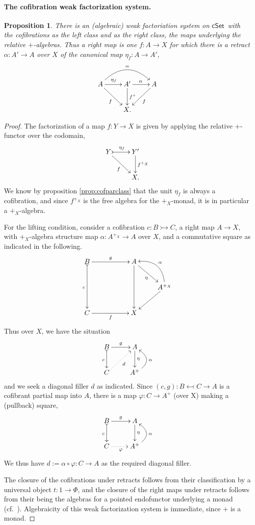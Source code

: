 \documentclass[12pt]{article}
\newcommand{\cSet}{\ensuremath{\mathsf{cSet}}}
\newcommand{\mono}{\ensuremath{\rightarrowtail}}
\newcommand{\ra}{\ensuremath{\rightarrow}}
\newtheorem{proposition}[theorem]{Proposition}
\theoremstyle{remark}
\theoremstyle{definition}
\begin{document}
\paragraph{The cofibration weak factorization system.}

\begin{proposition}
There is an (algebraic) weak factoriation system on \cSet\ with the cofibrations as the left class and as the right class, the maps underlying the relative $+$-algebras. Thus a right map is one $f :A\ra X$ for which there is a retract $\alpha : A'\ra A$ over $X$ of the canonical map $\eta_f : A\ra A'$,
\[
\xymatrix{
A\ar[rd]_{f} \ar[r]^{\eta_f} \ar@/^5ex/ [rr]^= & A' \ar[r]^{\alpha} \ar[d]^-{f^+} & \ar[ld]^{f} A \\
& X. &
}
\]
\end{proposition}
\begin{proof}
The factorization of a map $f : Y\ra X$ is given by applying the relative $+$-functor over the codomain,
\[
\xymatrix{
Y\ar[rd]_{f} \ar@{>->}[r]^{\eta_f} & Y' \ar[d]^-{f^{+_X}} \\
& X. 
}
\]
We know by proposition \ref{prop:cofparclass} that the unit $\eta_f$ is always a cofibration, and since $f^{+_{X}}$ is the free algebra for the $+_X$-monad, it is in particular a $+_X$-algebra.

For the lifting condition, consider a cofibration $c : B\mono C$, a right map $A\ra X$, with $+_X$-algebra structure map $\alpha: A^{+_{X}} \ra A$ over $X$, and a commutative square as indicated in the following.
\[
\xymatrix{
B \ar@{>->}[dd]_{c} \ar[rr]^{g}  && A \ar[dd] \ar[rd]_{\eta} & \\
 &&& A^{+_{X}} \ar@/_4ex/ [lu]_\alpha  \ar[ld] \\
C \ar[rr]_{f} && X &
}
\]
Thus over $X$, we have the situation
\[
\xymatrix{
B\ar@{>->}[d]_{c} \ar[r]^{g} & A \ar[d]^-{\eta} \\
C \ar@{.>}[ru]_{d} & A^+ \ar@/_4ex/ [u]_\alpha
}
\]
and we seek a diagonal filler $d$ as indicated.
Since $(c,g) : B \leftarrowtail C \ra A$ is a cofibrant partial map into $A$, there is a map $\varphi : C \ra A^+$ (over X) making a (pullback) square,
\[
\xymatrix{
B\ar@{>->}[d]_{c} \ar[r]^{g} & A \ar[d]^-{\eta} \\
C \ar@{.>}[r]_{\varphi} & A^+ \ar@/_4ex/ [u]_\alpha
}
\]
We thus have $d := \alpha\circ \varphi : C \ra A$ as the required diagonal filler.

The closure of the cofibrations under retracts follows from their classification by a universal object $t : 1 \ra \Phi$, and the closure of the right maps under retracts follows from their being the algebras for a pointed endofunctor underlying a monad (cf.~\cite{RV}).  Algebraicity of this weak factorization system is immediate, since $+$ is a monad.
\end{proof}
\end{document}
